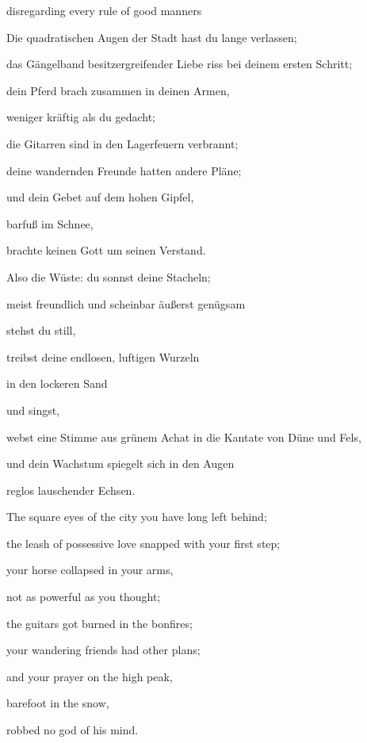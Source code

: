 disregarding every rule of good manners


\bigskip



\bigskip

Die quadratischen Augen der Stadt hast du lange verlassen;

das Gängelband besitzergreifender Liebe riss bei deinem ersten Schritt;

dein Pferd brach zusammen in deinen Armen,

weniger kräftig als du gedacht;

die Gitarren sind in den Lagerfeuern verbrannt;

deine wandernden Freunde hatten andere Pläne;

und dein Gebet auf dem hohen Gipfel,

barfuß im Schnee,

brachte keinen Gott um seinen Verstand.


\bigskip

Also die Wüste: du sonnst deine Stacheln;

meist freundlich und scheinbar äußerst genügsam

stehst du still,

treibst deine endlosen, luftigen Wurzeln

in den lockeren Sand

und singst,

webst eine Stimme aus grünem Achat in die Kantate von Düne und Fels,

und dein Wachstum spiegelt sich in den Augen

reglos lauschender Echsen.


\bigskip



\bigskip

The square eyes of the city you have long left behind;

the leash of possessive love snapped with your first step;

your horse collapsed in your arms,

not as powerful as you thought;

the guitars got burned in the bonfires;

your wandering friends had other plans;

and your prayer on the high peak,

barefoot in the snow,

robbed no god of his mind.


